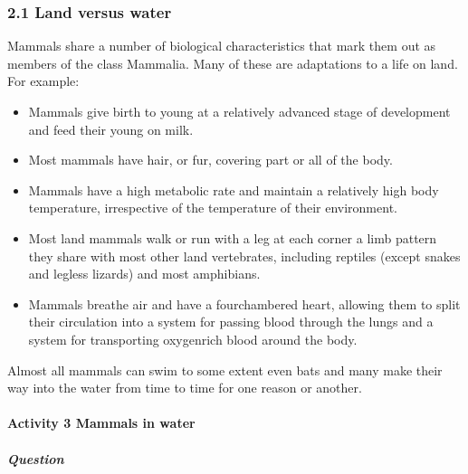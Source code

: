 \documentclass[letterpaper,10pt,english]{sphinxmanual}
\let\sphinxpxdimen\pdfpxdimen\else\newdimen\sphinxpxdimen
\begin{document}
\subsubsection{2.1 Land versus water}
\label{\detokenize{content/session_00/Part_00_02:2.1-Land-versus-water}}
Mammals share a number of biological characteristics that mark them out as members of the class Mammalia. Many of these are adaptations to a life on land. For example:
\begin{itemize}
\item {} 
Mammals give birth to young at a relatively advanced stage of development and feed their young on milk.

\item {} 
Most mammals have hair, or fur, covering part or all of the body.

\item {} 
Mammals have a high metabolic rate and maintain a relatively high body temperature, irrespective of the temperature of their environment.

\item {} 
Most land mammals walk or run with a leg at each corner \textendash{} a limb pattern they share with most other land vertebrates, including reptiles (except snakes and legless lizards) and most amphibians.

\item {} 
Mammals breathe air and have a four\sphinxhyphen{}chambered heart, allowing them to split their circulation into a system for passing blood through the lungs and a system for transporting oxygen\sphinxhyphen{}rich blood around the body.

\end{itemize}

Almost all mammals can swim to some extent \textendash{} even bats \textendash{} and many make their way into the water from time to time for one reason or another.


\paragraph{Activity 3 Mammals in water}
\label{\detokenize{content/session_00/Part_00_02:Activity-3-Mammals-in-water}}


\subparagraph{Question}
\label{\detokenize{content/session_00/Part_00_02:Question}}
\sphinxincludegraphics[width=880\sphinxpxdimen,height=986\sphinxpxdimen]{{s182_11_figure_5_elephant}.jpg}
\end{document}
